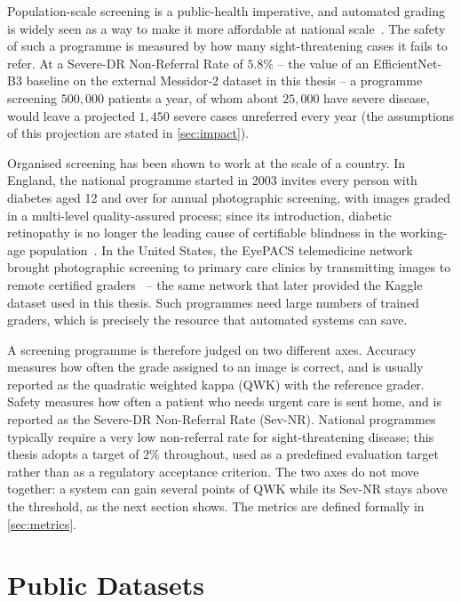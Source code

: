 Population-scale screening is a public-health imperative, and automated
grading is widely seen as a way to make it more affordable at national
scale~\cite{ting2017jama,abramoff2018pivotal}. The safety of such a programme is measured by how many
sight-threatening cases it fails to refer. At a Severe-DR Non-Referral Rate of
$5.8\%$ -- the value of an EfficientNet-B3 baseline on the external Messidor-2 dataset in
this thesis -- a programme screening $500{,}000$ patients a year, of whom about $25{,}000$
have severe disease, would leave a projected $1{,}450$ severe cases unreferred every year (the assumptions of this
projection are stated in \cref{sec:impact}).

Organised screening has been shown to work at the scale of a country. In England, the
national programme started in 2003 invites every person with diabetes aged 12 and over for
annual photographic screening, with images graded in a multi-level quality-assured
process; since its introduction, diabetic retinopathy is no longer the leading cause of
certifiable blindness in the working-age population~\cite{scanlon2017english}. In the
United States, the EyePACS telemedicine network brought photographic screening to primary
care clinics by transmitting images to remote certified graders~\cite{cuadros2009eyepacs}
-- the same network that later provided the Kaggle dataset used in this thesis. Such
programmes need large numbers of trained graders, which is precisely the resource that
automated systems can save.

A screening programme is therefore judged on two different axes. Accuracy measures how
often the grade assigned to an image is correct, and is usually reported as the quadratic
weighted kappa (QWK) with the reference grader. Safety measures how often a patient who
needs urgent care is sent home, and is reported as the Severe-DR Non-Referral Rate
(Sev-NR). National programmes typically require a very low non-referral rate for
sight-threatening disease; this thesis adopts a target of $2\%$ throughout, used as a
predefined evaluation target rather than as a regulatory acceptance criterion. The two axes
do not move together: a system can gain several points of QWK while its Sev-NR stays above
the threshold, as the next section shows. The metrics are defined formally in
\cref{sec:metrics}.

\section{Public Datasets}
\label{sec:datasets}\label{app:datasets}

